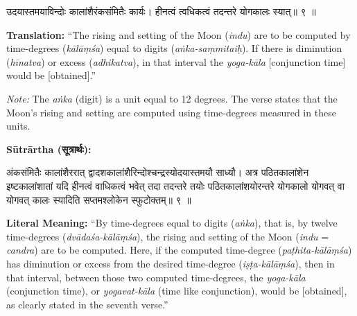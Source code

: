 \documentclass[11pt,a4paper]{article}
\newcommand{\dev}[1]{{\devanagarifont #1}}
\newenvironment{sanskritverse}{%
  \begin{center}\begin{minipage}{0.95\textwidth}
  \setlength{\leftskip}{1em}
  \setlength{\rightskip}{1em}
  \dev
}{\end{minipage}\end{center}}
\newenvironment{paracol}[1]{\begingroup}{\endgroup}
\newcommand{\switchcolumn}[1][]{%
  \ifnum#1=0\relax\else\par\nobreak\vspace{0.5em}\par\nobreak\fi%
}
\begin{document}
\begin{paracol}{2}

\begin{sanskritverse}
उदयास्तमयाविन्दोः कालांशैरंकसंमितैः कार्यः।
हीनत्वं त्वधिकत्वं तदन्तरे योगकालः स्यात्॥ ९ ॥
\end{sanskritverse}

\switchcolumn

\textbf{Translation:} ``The rising and setting of the Moon (\textit{indu}) are to be computed by time-degrees (\textit{kālāṃśa}) equal to digits (\textit{aṅka-saṃmitaiḥ}). If there is diminution (\textit{hīnatva}) or excess (\textit{adhikatva}), in that interval the \textit{yoga-kāla} [conjunction time] would be [obtained].''

\textit{Note:} The \textit{aṅka} (digit) is a unit equal to 12 degrees. The verse states that the Moon's rising and setting are computed using time-degrees measured in these units.

\end{paracol}

\vspace{0.5em}

\begin{paracol}{2}

\noindent\textbf{Sūtrārtha (\dev{सूत्रार्थः}):}
\begin{sanskritverse}
अंकसंमितैः कालांशैररात् द्वादशकालांशैरिन्दोश्चन्द्रस्योदयास्तमयौ साध्यौ।
अत्र पठितकालांशेन इष्टकालांशातां यदि हीनत्वं वाधिकत्वं भवेत् तदा तदन्तरे तयोः
पठितकालांशयोरन्तरे योगकालो योगवत्‌ वा योगवत्‌ कालः स्यादिति सप्तमश्लोकेन
स्फुटोक्तम्॥ ९ ॥
\end{sanskritverse}

\switchcolumn

\textbf{Literal Meaning:} ``By time-degrees equal to digits (\textit{aṅka}), that is, by twelve time-degrees (\textit{dvādaśa-kālāṃśa}), the rising and setting of the Moon (\textit{indu} = \textit{candra}) are to be computed. Here, if the computed time-degree (\textit{paṭhita-kālāṃśa}) has diminution or excess from the desired time-degree (\textit{iṣṭa-kālāṃśa}), then in that interval, between those two computed time-degrees, the \textit{yoga-kāla} (conjunction time), or \textit{yogavat-kāla} (time like conjunction), would be [obtained], as clearly stated in the seventh verse.''

\end{paracol}
\end{document}
